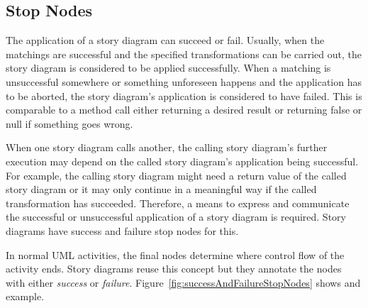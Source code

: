 \subsection{Stop Nodes} \label{sec:StopNodes}

The application of a story diagram can succeed or fail.
Usually, when the matchings are successful and the specified transformations can be carried out, the story diagram is considered to be applied successfully.
When a matching is unsuccessful somewhere or something unforeseen happens and the application has to be aborted, the story diagram's application is considered to have failed.
This is comparable to a method call either returning a desired result or returning false or null if something goes wrong.


When one story diagram calls another, the calling story diagram's further execution may depend on the called story diagram's application being successful.
For example, the calling story diagram might need a return value of the called story diagram or it may only continue in a meaningful way if the called transformation has succeeded.
Therefore, a means to express and communicate the successful or unsuccessful application of a story diagram is required.
Story diagrams have success and failure stop nodes for this.

In normal UML activities, the final nodes determine where control flow of the activity ends.
Story diagrams reuse this concept but they annotate the nodes with either \emph{success} or \emph{failure}.
Figure~\ref{fig:successAndFailureStopNodes} shows and example.

